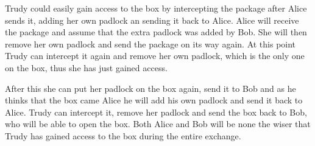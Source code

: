 Trudy could easily gain access to the box by intercepting the package after Alice sends it, adding her own padlock an sending it back to Alice. Alice will receive the package and assume that the extra padlock was added by Bob. She will then remove her own padlock and send the package on its way again. At this point Trudy can intercept it again and remove her own padlock, which is the only one on the box, thus she has just gained access.

After this she can put her padlock on the box again, send it to Bob and as he thinks that the box came Alice he will add his own padlock and send it back to Alice. Trudy can intercept it, remove her padlock and send the box back to Bob, who will be able to open the box. Both Alice and Bob will be none the wiser that Trudy has gained access to the box during the entire exchange.